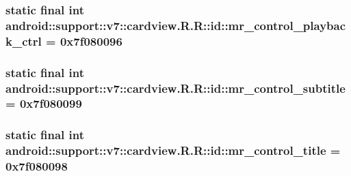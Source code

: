 \hypertarget{classandroid_1_1support_1_1v7_1_1cardview_1_1_r_1_1id_b8310d39d1ca10ed5bd89d3bbf13fe75}{
\subsubsection[{mr\_\-control\_\-playback\_\-ctrl}]{\setlength{\rightskip}{0pt plus 5cm}static final int android::support::v7::cardview.R.R::id::mr\_\-control\_\-playback\_\-ctrl = 0x7f080096}}
\label{classandroid_1_1support_1_1v7_1_1cardview_1_1_r_1_1id_b8310d39d1ca10ed5bd89d3bbf13fe75}


\hypertarget{classandroid_1_1support_1_1v7_1_1cardview_1_1_r_1_1id_b72b8001d492baa41e100625eccfa2bc}{
\subsubsection[{mr\_\-control\_\-subtitle}]{\setlength{\rightskip}{0pt plus 5cm}static final int android::support::v7::cardview.R.R::id::mr\_\-control\_\-subtitle = 0x7f080099}}
\label{classandroid_1_1support_1_1v7_1_1cardview_1_1_r_1_1id_b72b8001d492baa41e100625eccfa2bc}


\hypertarget{classandroid_1_1support_1_1v7_1_1cardview_1_1_r_1_1id_8978afaf3859568bc343390908aafbcd}{
\subsubsection[{mr\_\-control\_\-title}]{\setlength{\rightskip}{0pt plus 5cm}static final int android::support::v7::cardview.R.R::id::mr\_\-control\_\-title = 0x7f080098}}
\label{classandroid_1_1support_1_1v7_1_1cardview_1_1_r_1_1id_8978afaf3859568bc343390908aafbcd}



